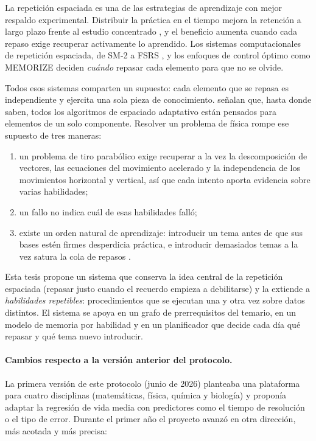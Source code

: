 \documentclass[12pt]{article}
\theoremstyle{definition}
\begin{document}
La repetición espaciada es una de las estrategias de aprendizaje con mejor respaldo experimental. Distribuir la práctica en el tiempo mejora la retención a largo plazo frente al estudio concentrado \citep{cepeda2006,kang2016}, y el beneficio aumenta cuando cada repaso exige recuperar activamente lo aprendido. Los sistemas computacionales de repetición espaciada, de SM-2 \citep{wozniak1990} a FSRS \citep{ye2022}, y los enfoques de control óptimo como MEMORIZE \citep{tabibian2019} deciden \emph{cuándo} repasar cada elemento para que no se olvide.

Todos esos sistemas comparten un supuesto: cada elemento que se repasa es independiente y ejercita una sola pieza de conocimiento. \citet{choffin2021} señalan que, hasta donde saben, todos los algoritmos de espaciado adaptativo están pensados para elementos de un solo componente. Resolver un problema de física rompe ese supuesto de tres maneras:

\begin{enumerate}[label=(\alph*)]
\item un problema de tiro parabólico exige recuperar a la vez la descomposición de vectores, las ecuaciones del movimiento acelerado y la independencia de los movimientos horizontal y vertical, así que cada intento aporta evidencia sobre varias habilidades;
\item un fallo no indica cuál de esas habilidades falló;
\item existe un orden natural de aprendizaje: introducir un tema antes de que sus bases estén firmes desperdicia práctica, e introducir demasiados temas a la vez satura la cola de repasos \citep{reddy2016}.
\end{enumerate}

Esta tesis propone un sistema que conserva la idea central de la repetición espaciada (repasar justo cuando el recuerdo empieza a debilitarse) y la extiende a \emph{habilidades repetibles}: procedimientos que se ejecutan una y otra vez sobre datos distintos. El sistema se apoya en un grafo de prerrequisitos del temario, en un modelo de memoria por habilidad y en un planificador que decide cada día qué repasar y qué tema nuevo introducir.

\paragraph{Cambios respecto a la versión anterior del protocolo.} La primera versión de este protocolo (junio de 2026) planteaba una plataforma para cuatro disciplinas (matemáticas, física, química y biología) y proponía adaptar la regresión de vida media \citep{settles2016} con predictores como el tiempo de resolución o el tipo de error. Durante el primer año el proyecto avanzó en otra dirección, más acotada y más precisa:
\end{document}
